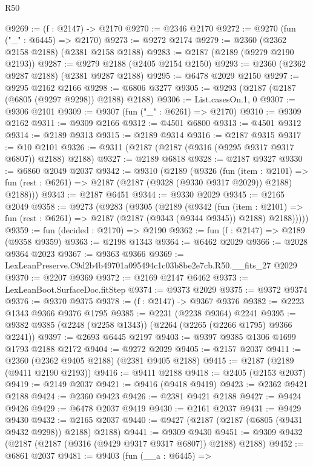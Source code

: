 \begin{lexlean}{R50}
\begin{coremodule}
@9269 := (f : @2147) -> @2170
@9270 := @2346 @2170
@9272 := @9270 (fun ("_" : @6445) => @2170)
@9273 := @9272 @2174
@9279 := @2360 (@2362 @2158 @2188) (@2381 @2158 @2188)
@9283 := @2187 (@2189 (@9279 @2190 @2193))
@9287 := @9279 @2188 (@2405 @2154 @2150)
@9293 := @2360 (@2362 @9287 @2188) (@2381 @9287 @2188)
@9295 := @6478 @2029 @2150
@9297 := @9295 @2162 @2166
@9298 := @6806 @3277
@9305 := @9293 (@2187 (@2187 (@6805 (@9297 @9298)) @2188) @2188)
@9306 := List.casesOn.{1, 0}
@9307 := @9306 @2101
@9309 := @9307 (fun ("_" : @6261) => @2170)
@9310 := @9309 @2162
@9311 := @9309 @2166
@9312 := @4501 @6800
@9313 := @4501 @9312
@9314 := @2189 @9313
@9315 := @2189 @9314
@9316 := @2187 @9315
@9317 := @10 @2101
@9326 := @9311 (@2187 (@2187 (@9316 (@9295 @9317 @9317 @6807)) @2188) @2188)
@9327 := @2189 @6818
@9328 := @2187 @9327
@9330 := @6860 @2049 @2037
@9342 := @9310
    (@2189
      (@9326
        (fun (item : @2101) =>
        fun (rest : @6261) => @2187 (@2187 (@9328 (@9330 @9317 @2029)) @2188) @2188)))
@9343 := @2187 @6451
@9344 := @9330 @2029
@9345 := @2165 @2049
@9358 := @9273
    (@9283
      (@9305
        (@2189
          (@9342
            (fun (item : @2101) =>
            fun (rest : @6261) => @2187 (@2187 (@9343 (@9344 @9345)) @2188) @2188)))))
@9359 := fun (decided : @2170) => @2190
@9362 := fun (f : @2147) => @2189 (@9358 @9359)
@9363 := @2198 @1343
@9364 := @6462 @2029
@9366 := @2028 @9364 @2023
@9367 := @9363 @9366
@9369 := LexLeanPreserve.C9d2b4b49701a095494c1c03b8be2e7cb.R50.__fits_27 @2029
@9370 := @2207 @9369
@9372 := @2169 @2147 @6462
@9373 := LexLeanBoot.SurfaceDoc.fitStep
@9374 := @9373 @2029
@9375 := @9372 @9374
@9376 := @9370 @9375
@9378 := (f : @2147) -> @9367 @9376
@9382 := @2223 @1343 @9366 @9376 @1795
@9385 := @2231 (@2238 @9364) @2241
@9395 := @9382 @9385 (@2248 (@2258 @1343)) (@2264 (@2265 (@2266 @1795) @9366 @2241))
@9397 := @2693 @6445 @2197
@9403 := @9397 @9385 @1306 @1699 @1793 @2188 @2172
@9404 := @9272 @2029
@9405 := @2157 @2037
@9411 := @2360 (@2362 @9405 @2188) (@2381 @9405 @2188)
@9415 := @2187 (@2189 (@9411 @2190 @2193))
@9416 := @9411 @2188
@9418 := @2405 (@2153 @2037)
@9419 := @2149 @2037
@9421 := @9416 (@9418 @9419)
@9423 := @2362 @9421 @2188
@9424 := @2360 @9423
@9426 := @2381 @9421 @2188
@9427 := @9424 @9426
@9429 := @6478 @2037 @9419
@9430 := @2161 @2037
@9431 := @9429 @9430
@9432 := @2165 @2037
@9440 := @9427 (@2187 (@2187 (@6805 (@9431 @9432 @9298)) @2188) @2188)
@9441 := @9309 @9430
@9451 := @9309 @9432 (@2187 (@2187 (@9316 (@9429 @9317 @9317 @6807)) @2188) @2188)
@9452 := @6861 @2037
@9481 := @9403
    (fun (__a : @6445) =>

\end{coremodule}
\end{lexlean}
